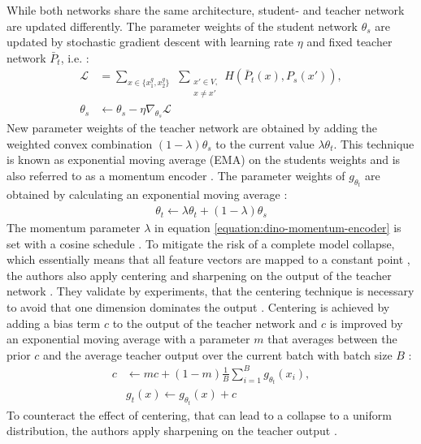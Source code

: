 \par
While both networks share the same architecture, student- and teacher network are updated differently. 
The parameter weights of the student network $\theta_s$ are updated by stochastic gradient descent with learning rate $\eta$ and fixed teacher network $\bar{P}_t$, i.e. \citep{Caron2021}:
\begin{align}
	\mathcal{L}  &= \sum_{x \in \{x_1^g, x_2^g\}} \hspace{5pt} \sum_{\substack{ x\prime \in V, \\ x\neq x\prime}} H(\bar P_t(x),P_s(x\prime)), \\ 
	\theta_s &\leftarrow \theta_s - \eta \nabla_{\theta_s} \mathcal{L}
\end{align}
New parameter weights of the teacher network are obtained by adding the weighted convex combination $(1-\lambda)\theta_s$ to the current value $\lambda\theta_t$.
This technique is known as exponential moving average (EMA) on the students weights and is also referred to as a momentum encoder \citep{He2019,Caron2021}.
The parameter weights of $g_{\theta_t}$ are obtained by calculating an exponential moving average \citep{Grill2020,Caron2021}: 
\begin{align}
	\theta_t \leftarrow \lambda \theta_t + (1-\lambda) \theta_s
	\label{equation:dino-momentum-encoder}
\end{align}
The momentum parameter $\lambda$ in equation \ref{equation:dino-momentum-encoder} is set with a cosine schedule \citep{Grill2020}.
To mitigate the risk of a complete model collapse, which essentially means that all feature vectors are mapped to a constant point \citep{Jing2022}, the authors also apply centering and sharpening on the output of the teacher network \citep{Caron2021}.
They validate by experiments, that the centering technique is necessary to avoid that one dimension dominates the output \citep{Caron2021}.
Centering is achieved by adding a bias term $c$ to the output of the teacher network and $c$ is improved by an exponential moving average with a parameter $m$ that averages between the prior $c$ and the average teacher output over the current batch with batch size $B$ \citep{Caron2021}:
\begin{align}
	c & \leftarrow mc + (1-m) \frac{1}{B}\sum_{i=1}^B g_{\theta_t}(x_i), \\
	& g_t(x) \leftarrow g_{\theta_t}(x) + c
	\label{equation:dino-centering}
\end{align}
To counteract the effect of centering, that can lead to a collapse to a uniform distribution, the authors apply sharpening on the teacher output \citep{Caron2021}.
